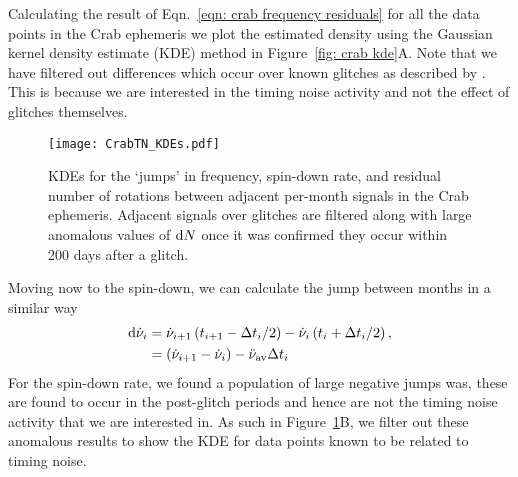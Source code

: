 \documentclass[../full_thesis/full_thesis.tex]{subfiles}
\begin{document}
{Calculating the result of Eqn.~\eqref{eqn: crab frequency residuals} for all
the data points in the Crab ephemeris we plot the estimated density using the
Gaussian kernel density estimate (KDE) method \citep{Scipy} in Figure~\ref{fig:
crab kde}A. Note that we have filtered out differences which occur over known
glitches as described by \citet{Espinoza2011}. This is because we are
interested in the timing noise activity and not the effect of glitches
themselves.
\begin{figure}[ht]
\centering
\texttt{[image: CrabTN\_KDEs.pdf]}
\caption{KDEs for the `jumps' in frequency, spin-down rate, and residual number
of rotations between adjacent per-month signals in the Crab ephemeris.
Adjacent signals over glitches are filtered along with large anomalous values
of $\mathrm{d} N$ once it was confirmed they occur within 200 days after a glitch.}
\label{fig: crab kde}
\end{figure}

Moving now to the spin-down, we can calculate the jump between months in a similar way
\begin{align}
\mathrm{d}\dot{\nu}_{i} & = \dot{\nu}_{i+1}\left(t_{i+1}-\Delta t_{i}/2\right) -  \dot{\nu}_{i}\left(t_{i}+\Delta t_{i}/2\right), \\
& = \left(\dot{\nu}_{i+1}-\dot{\nu}_{i}\right) -  \ddot{\nu}_{\textrm{av}} \Delta t_{i}
\label{eqn: crab spindown residuals}
\end{align}
For the spin-down rate, we found a population of large negative jumps was, these are
found to occur in the post-glitch periods and hence are not the timing noise
activity that we are interested in. As such in Figure~\ref{fig: crab kde}B, we
filter out these anomalous results to show the KDE for data points known to be
related to timing noise.

}
\end{document}
